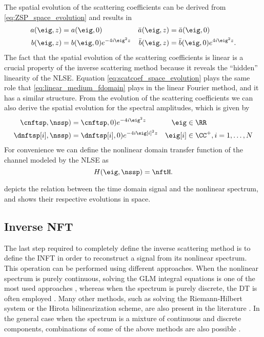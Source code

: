 The spatial evolution of the scattering coefficients can be derived from
\eqref{eq:ZSP_space_evolution} and results in ~\cite{Ablowitz2004a}
\begin{subequations}\label{eq:scatcoef_space_evolution}
\begin{align}
a(\eig,z)&=a(\eig, 0) & \bar{a}(\eig,z)&=\bar{a}(\eig,0)\\
b(\eig,z)&=b(\eig,0)e^{-4i\eig^2z} & \bar{b}(\eig,z)&=\bar{b}(\eig,0)e^{4i\eig^2z}.
\end{align}
\end{subequations}
The fact that the spatial evolution of the scattering coefficients is linear is a crucial property
of the inverse scattering method because it reveals the ``hidden'' linearity of the
\ac{NLSE}. Equation \eqref{eq:scatcoef_space_evolution} plays the same role that
\eqref{eq:linear_medium_fdomain} plays in the linear Fourier method, and it has
 a similar structure.
From the evolution of the scattering coefficients we can also derive
the spatial evolution for the spectral amplitudes, which is given by
\begin{subequations}\label{eq:spamps_space_evolution}
\begin{align}
\cnftsp, \nssp)&=\cnftsp , 0)e^{-4i\eig^2z} &\eig&\in \RR\\
\dnftsp[i], \nssp)&=\dnftsp[i], 0)e^{-4i\eig[i]^2z} &\eig[i]&\in \CC^+, i = 1,\dots, N
\end{align}
\end{subequations}
For convenience we can define the nonlinear domain transfer function of the channel modeled by the \ac{NLSE} as
\begin{equation}\label{eq:ch_transfer_function}
  H(\eig, \nssp) = \nftH.
\end{equation}

 depicts the relation between the time domain signal and the nonlinear spectrum, and shows their respective evolutions in space.


\subsection{Inverse \acl{NFT}}\label{sec:INFT_NLSE}
The last step required to completely define the inverse scattering method is to define the \ac{INFT} in order to reconstruct a signal from its nonlinear
spectrum. This operation can be performed using
different approaches. When the nonlinear spectrum is purely continuous, solving
the \ac{GLM} integral equations is one of the most used approaches
\cite{prilepsky2013nonlinear}, whereas when the spectrum is purely discrete, the
\ac{DT} is often employed \cite{Buelow}. Many other methods, such as
solving the Riemann-Hilbert system or the Hirota bilinearization scheme, are also
present in the literature \cite{Yousefi2014}. In the general case when the
spectrum is a mixture of continuous and discrete components, combinations of some of
the above methods are also possible \cite{aref2016demonstration}.

